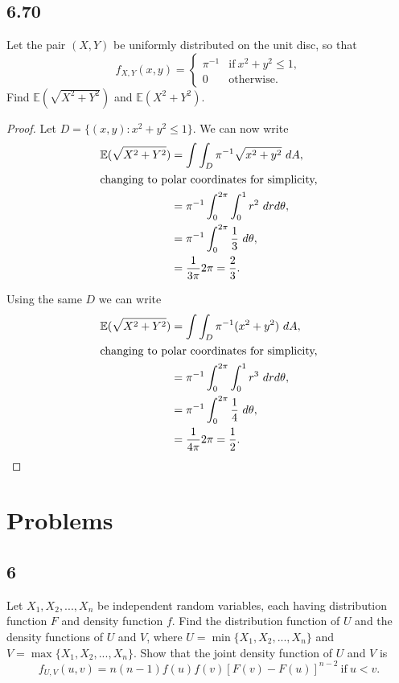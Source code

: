 \documentclass{article}
\newcommand{\E}[1]{\mathbb{E}(#1)}
\begin{document}
\subsection*{6.70}
Let the pair $(X,Y)$ be uniformly distributed on the unit disc, so that
\begin{equation*}
    f_{X,Y}(x,y) = \begin{cases}
        \pi^{-1} & \text{if} \ x^2 + y^2 \leq 1, \\
        0        & \text{otherwise}.
    \end{cases}
\end{equation*}
Find $\E{\sqrt{X^2 + Y^2}}$ and $\E{X^2 + Y^2}$.

\begin{proof}
    Let $D = \{(x,y): x^2 + y^2 \leq 1\}$. We can now write
    \begin{align*}
        \E{\sqrt{X^2+Y^2}} & = \int\int_D \pi^{-1}\sqrt{x^2+y^2} \ dA,        \\
        \intertext{changing to polar coordinates for simplicity,}
                           & = \pi^{-1}\int_0^{2\pi}\int_0^1 r^2 \ drd\theta, \\
                           & = \pi^{-1}\int_0^{2\pi}\frac{1}{3} \ d\theta,    \\
                           & = \frac{1}{3\pi}2\pi = \frac{2}{3}.
    \end{align*}

    Using the same $D$ we can write
    \begin{align*}
        \E{\sqrt{X^2+Y^2}} & = \int\int_D \pi^{-1}(x^2+y^2) \ dA,             \\
        \intertext{changing to polar coordinates for simplicity,}
                           & = \pi^{-1}\int_0^{2\pi}\int_0^1 r^3 \ drd\theta, \\
                           & = \pi^{-1}\int_0^{2\pi}\frac{1}{4} \ d\theta,    \\
                           & = \frac{1}{4\pi}2\pi = \frac{1}{2}.
    \end{align*}
\end{proof}


\section*{Problems}
\subsection*{6}
Let $X_1, X_2,...,X_n$ be independent random variables, each having
distribution function $F$ and density function $f$. Find the distribution
function of $U$ and the density functions of $U$ and $V$, where
$U = \min\{X_1,X_2,...,X_n\}$ and $V = \max\{X_1, X_2,...,X_n\}$.
Show that the joint density function of $U$ and $V$ is
\begin{equation*}
    f_{U,V}(u,v) = n(n-1)f(u)f(v)[F(v)-F(u)]^{n-2} \ \text{if} \ u < v.
\end{equation*}
\end{document}
